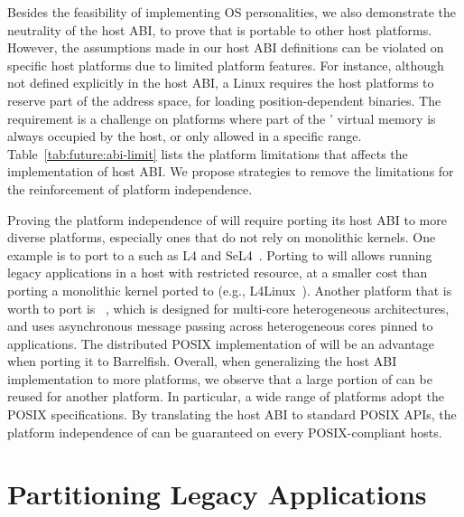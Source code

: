 Besides the feasibility of implementing OS personalities,
we also demonstrate the neutrality of the host ABI,
to prove that \graphene{} is portable to other host platforms.
However, the assumptions made in our host ABI definitions
can be violated on specific host platforms
due to limited platform features.
For instance, although not defined explicitly in the host ABI,
a Linux \picoprocs{} requires the host platforms
to reserve part of the address space, for loading position-dependent binaries.
The requirement is a challenge on platforms
where part of the \picoprocs{}' virtual memory is always occupied by the host,
or only allowed in a specific range.
Table~\ref{tab:future:abi-limit}
lists the platform limitations that affects the implementation of host ABI.
We propose strategies to remove the limitations for the reinforcement of platform independence.


Proving the platform independence of \graphene{} will
require porting its host ABI to more diverse platforms,
especially ones that do not rely on monolithic kernels.
One example is to port \graphene{} to a \term{\microkernel{}}
such as L4 and SeL4~\citep{l4family, klein09sel4}.
Porting \picoprocs{} to \microkernel{} will allows running legacy applications
in a host with restricted resource,
at a smaller cost than porting a monolithic kernel ported to \microkernel{}
(e.g., L4Linux~\citep{hartig97mu}).
Another platform that is worth to port \graphene{} is ~\citep{baumann09barrelfish},
which is designed for multi-core heterogeneous architectures,
and uses asynchronous message passing across heterogeneous cores pinned to applications.
The distributed POSIX implementation of \graphene{}
will be an advantage when porting it to Barrelfish.
Overall, when generalizing the host ABI implementation to more platforms,
we observe that a large portion of \graphene{} \pal{}
can be reused for another platform.
In particular, a wide range of platforms adopt the POSIX specifications.
By translating the \graphene{} host ABI to standard POSIX APIs,
the platform independence of \graphene{} can be guaranteed on
every POSIX-compliant hosts.



\section{Partitioning Legacy Applications}
\label{sec:future:partitioning}


